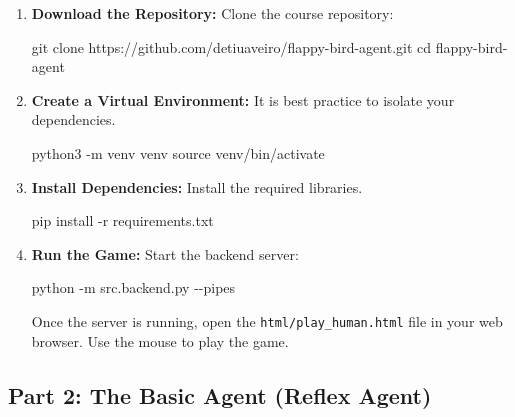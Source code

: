 \documentclass[
  12pt,
]{article}
\newenvironment{Shaded}{}{}
\newcommand{\AttributeTok}[1]{\textcolor[rgb]{0.49,0.56,0.16}{#1}}
\newcommand{\BuiltInTok}[1]{\textcolor[rgb]{0.00,0.50,0.00}{#1}}
\newcommand{\ExtensionTok}[1]{#1}
\newcommand{\FunctionTok}[1]{\textcolor[rgb]{0.02,0.16,0.49}{#1}}
\newcommand{\NormalTok}[1]{#1}
\begin{document}
\begin{enumerate}
\def\labelenumi{\arabic{enumi}.}
\item
  \textbf{Download the Repository:} Clone the course repository:

\begin{Shaded}
\begin{Highlighting}[]
\FunctionTok{git}\NormalTok{ clone https://github.com/detiuaveiro/flappy{-}bird{-}agent.git}
\BuiltInTok{cd}\NormalTok{ flappy{-}bird{-}agent}
\end{Highlighting}
\end{Shaded}
\item
  \textbf{Create a Virtual Environment:} It is best practice to isolate
  your dependencies.

\begin{Shaded}
\begin{Highlighting}[]
\ExtensionTok{python3} \AttributeTok{{-}m}\NormalTok{ venv venv}
\BuiltInTok{source}\NormalTok{ venv/bin/activate}
\end{Highlighting}
\end{Shaded}
\item
  \textbf{Install Dependencies:} Install the required libraries.

\begin{Shaded}
\begin{Highlighting}[]
\ExtensionTok{pip}\NormalTok{ install }\AttributeTok{{-}r}\NormalTok{ requirements.txt}
\end{Highlighting}
\end{Shaded}
\item
  \textbf{Run the Game:} Start the backend server:

\begin{Shaded}
\begin{Highlighting}[]
\ExtensionTok{python} \AttributeTok{{-}m}\NormalTok{ src.backend.py }\AttributeTok{{-}{-}pipes}
\end{Highlighting}
\end{Shaded}

  Once the server is running, open the \texttt{html/play\_human.html}
  file in your web browser. Use the mouse to play the game.
\end{enumerate}

\subsection{Part 2: The Basic Agent (Reflex
Agent)}\label{part-2-the-basic-agent-reflex-agent}
\end{document}
